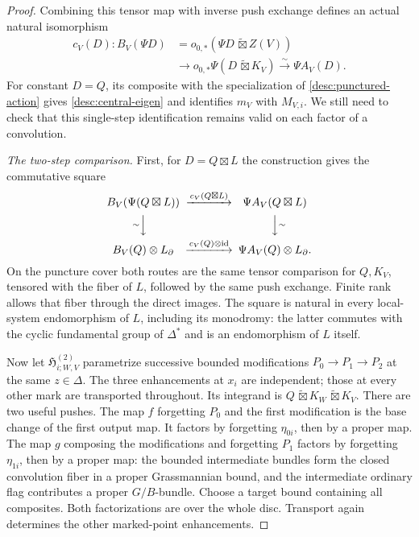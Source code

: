 \begin{proof}
Combining this tensor map with inverse push exchange defines an
actual natural isomorphism
\begin{equation}\label{desc:comparison}
 \begin{split}
 c_V(D):B_V(\Psi D)
 &=o_{0,*}(\Psi D\,\widetilde\boxtimes Z(V))\\
 &\longrightarrow o_{0,*}\Psi(D\,\widetilde\boxtimes K_V)
       \xrightarrow{\sim}\Psi A_V(D).
 \end{split}
\end{equation}
For constant $D=Q$, its composite with the specialization of
\eqref{desc:punctured-action} gives \eqref{desc:central-eigen} and
identifies $m_V$ with $M_{V,i}$.  We still need to check that this
single-step identification remains valid on each factor of a
convolution.

\emph{The two-step comparison.}
First, for $D=Q\boxtimes L$ the construction gives the commutative
square
\begin{equation}\label{desc:lisse-square}
\begin{CD}
 B_V(\Psi(Q\boxtimes L)) @>{c_V(Q\boxtimes L)}>>
                         \Psi A_V(Q\boxtimes L)\\
 @V{\sim}VV @VV{\sim}V\\
 B_V(Q)\otimes L_\partial @>{c_V(Q)\otimes\mathrm{id}}>>
                         \Psi A_V(Q)\otimes L_\partial.
\end{CD}
\end{equation}
On the puncture cover both routes are the same tensor comparison
for $Q,K_V$, tensored with the fiber of $L$, followed by the same
push exchange.  Finite rank allows that fiber through the direct
images.  The square is natural in every local-system endomorphism
of $L$, including its monodromy: the latter commutes with the cyclic
fundamental group of $\Delta^*$ and is an endomorphism of $L$ itself.

Now let $\mathfrak H^{(2)}_{i;W,V}$ parametrize successive bounded
modifications $P_0\to P_1\to P_2$ at the same $z\in\Delta$.
The three enhancements at $x_i$ are independent; those at every
other mark are transported throughout.  Its integrand is
$Q\,\widetilde\boxtimes K_W\,\widetilde\boxtimes K_V$.
There are two useful pushes.  The map $f$ forgetting $P_0$ and the
first modification is the base change of the first output map.
It factors by forgetting $\eta_{0i}$, then by a proper map.  The map
$g$ composing the modifications and forgetting $P_1$ factors by
forgetting $\eta_{1i}$, then by a proper map: the bounded intermediate
bundles form the closed convolution fiber in a proper Grassmannian
bound, and the intermediate ordinary flag contributes a proper
$G/B$-bundle.  Choose a target bound containing all composites.
Both factorizations are over the whole disc.  Transport again
determines the other marked-point enhancements.


\end{proof}
